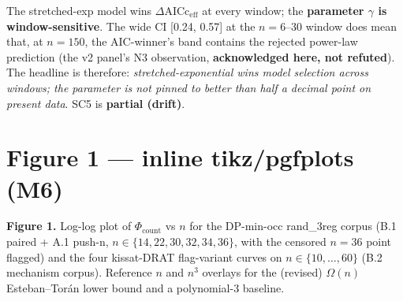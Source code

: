\documentclass[11pt,a4paper]{article}
\theoremstyle{remark}
\begin{document}
The stretched-exp model wins $\Delta$AICc$_{\mathrm{eff}}$ at every
window; the \textbf{parameter $\gamma$ is window-sensitive}. The wide CI
[0.24, 0.57] at the $n=6$--30 window does mean that, at $n = 150$, the
AIC-winner's band contains the rejected power-law prediction (the v2
panel's N3 observation, \textbf{acknowledged here, not refuted}). The
headline is therefore: \emph{stretched-exponential wins model selection
across windows; the parameter is not pinned to better than half a decimal
point on present data}. SC5 is \textbf{partial (drift)}.

\clearpage
\section{Figure 1 --- inline tikz/pgfplots (M6)}

\textbf{Figure 1.} Log-log plot of $\Phi_{\mathrm{count}}$ vs $n$ for the
DP-min-occ rand\_3reg corpus (B.1 paired + A.1 push-n, $n \in \{14, 22,
30, 32, 34, 36\}$, with the censored $n=36$ point flagged) and the four
kissat-DRAT flag-variant curves on $n \in \{10, \ldots, 60\}$ (B.2
mechanism corpus). Reference $n$ and $n^3$ overlays for the (revised)
$\Omega(n)$ Esteban--Tor\'an lower bound and a polynomial-3 baseline.
\end{document}
